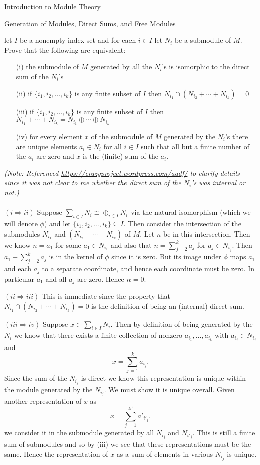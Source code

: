 \begin{chapter}{Introduction to Module Theory}
\begin{section}{Generation of Modules, Direct Sums, and Free Modules}
\begin{problem}\label{ex:10.3.21}
let $I$ be a nonempty index set and for each $i\in I$ let $N_i$ be a submodule of $M$. Prove that the following are equivalent:\begin{enumerate}
\item[(i)] the submodule of $M$ generated by all the $N_i$'s is isomorphic to the direct sum of the $N_i$'s
\item[(ii)] if $\{i_1,i_2,\ldots,i_k\}$ is any finite subset of $I$ then $N_{i_1}\cap (N_{i_2}+\cdots +N_{i_k}) = 0$
\item[(iii)] if $\{i_1,i_2,\ldots,i_k\}$ is any finite subset of $I$ then $N_{i_1}+\cdots +N_{i_k} = N_{i_1}\oplus \cdots \oplus N_{i_k}$
\item[(iv)] for every element $x$ of the submodule of $M$ generated by the $N_i$'s there are unique elements $a_i\in N_i$ for all $i\in I$ such that all but a finite number of the $a_i$ are zero and $x$ is the (finite) sum of the $a_i$. 
\end{enumerate}
\end{problem}
\begin{solution}
\emph{(Note: Referenced \url{https://crazyproject.wordpress.com/aadf/} to clarify details since it was not clear to me whether the direct sum of the $N_i$'s was internal or not.)}\\\\
$( i\Rightarrow ii)$ Suppose $\sum_{i\in I} N_i \cong \oplus_{i\in I} N_i$ via the natural isomorphism (which we will denote $\phi$) and let $\{i_1,i_2,\ldots, i_k\}\subseteq I$. Then consider the intersection of the submodules $N_{i_1}$ and $(N_{i_2}+\cdots +N_{i_k})$ of $M$. Let $n$ be in this intersection. Then we know $n = a_1$ for some $a_1\in N_{i_1}$ and also that $n= \sum_{j=2}^k a_j$ for $a_j\in N_{i_j}$. Then $a_1 - \sum_{j=2}^k a_j$ is in the kernel of $\phi$ since it is zero. But its image under $\phi$ maps $a_1$ and each $a_j$ to a separate coordinate, and hence each coordinate must be zero. In particular $a_1$ and all $a_j$ are zero. Hence $n=0$. 

$(ii\Rightarrow iii)$ This is immediate since the property that $N_{i_1}\cap (N_{i_2}+\cdots + N_{i_k}) = 0$ is the definition of being an (internal) direct sum.

$(iii\Rightarrow iv)$ Suppose $x\in \sum_{i\in I} N_i$. Then by definition of being generated by the $N_i$ we know that there exists a finite collection of nonzero $a_{i_1},\ldots, a_{i_k}$ with $a_{i_j}\in N_{i_j}$ and \[
x = \sum_{j=1}^k a_{i_j}.
\]
Since the sum of the $N_{i_j}$ is direct we know this representation is unique within the module generated by the $N_{i_j}$. We must show it is unique overall. Given another representation of $x$ as \[
x = \sum_{j=1}^{k'} a'_{i'_j}.
\]we consider it in the submodule generated by all $N_{i_j}$ and $N_{i'_j}$. This is still a finite sum of submodules and so by (iii) we see that these representations must be the same. Hence the representation of $x$ as a sum of elements in various $N_{i_j}$ is unique.


\end{solution}
\end{section}
\end{chapter}
